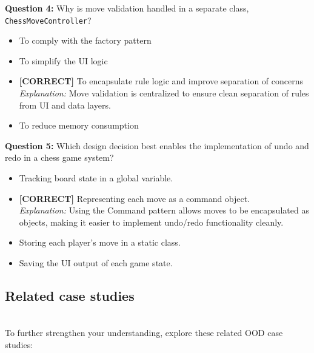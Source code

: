 \vspace{0.3cm}
\noindent
\textbf{Question 4:} Why is move validation handled in a separate class, \texttt{ChessMoveController}?
\\[0.2cm]
\begin{itemize}
 \item To comply with the factory pattern
 \item To simplify the UI logic
 \item \textbf{[CORRECT]} To encapsulate rule logic and improve separation of concerns
\\[0.1cm]
\textit{Explanation:} 
Move validation is centralized to ensure clean separation of rules from UI and data layers.
 \item To reduce memory consumption
\end{itemize}
\vspace{0.3cm}
\noindent
\textbf{Question 5:} Which design decision best enables the implementation of undo and redo in a chess game system?
\\[0.2cm]
\begin{itemize}
 \item Tracking board state in a global variable.
 \item \textbf{[CORRECT]} Representing each move as a command object.
\\[0.1cm]
\textit{Explanation:} 
Using the Command pattern allows moves to be encapsulated as objects, making it easier to implement undo/redo functionality cleanly.
 \item Storing each player's move in a static class.
 \item Saving the UI output of each game state.
\end{itemize}

\subsection{Related case studies}\label{-ux6mkfOIvB4cgS5LY9F-}
\\
To further strengthen your understanding, explore these related OOD case studies:


